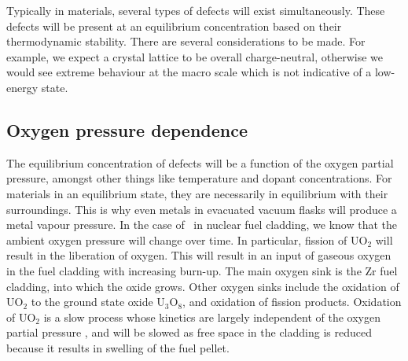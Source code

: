 Typically in materials, several types of defects will exist simultaneously. These defects will be present at an equilibrium concentration based on their thermodynamic stability. There are several considerations to be made. For example, we expect a crystal lattice to be overall charge-neutral, otherwise we would see extreme behaviour at the macro scale which is not indicative of a low-energy state.

\subsection{Oxygen pressure dependence}

The equilibrium concentration of defects will be a function of the oxygen partial pressure, amongst other things like temperature and dopant concentrations. For materials in an equilibrium state, they are necessarily in equilibrium with their surroundings. This is why even metals in evacuated vacuum flasks will produce a metal vapour pressure. In the case of \zirconia\ in nuclear fuel cladding, we know that the ambient oxygen pressure will change over time. In particular, fission of UO$_{2}$ will result in the liberation of oxygen. This will result in an input of gaseous oxygen in the fuel cladding with increasing burn-up. The main oxygen sink is the Zr fuel cladding, into which the oxide grows. Other oxygen sinks include the oxidation of UO$_{2}$ to the ground state oxide U$_{3}$O$_{8}$, and oxidation of fission products. Oxidation of UO$_{2}$ is a slow process whose kinetics are largely independent of the oxygen partial pressure \cite{Desgranges2009NeutronUO2}, and will be slowed as free space in the cladding is reduced because it results in swelling of the fuel pellet. 

